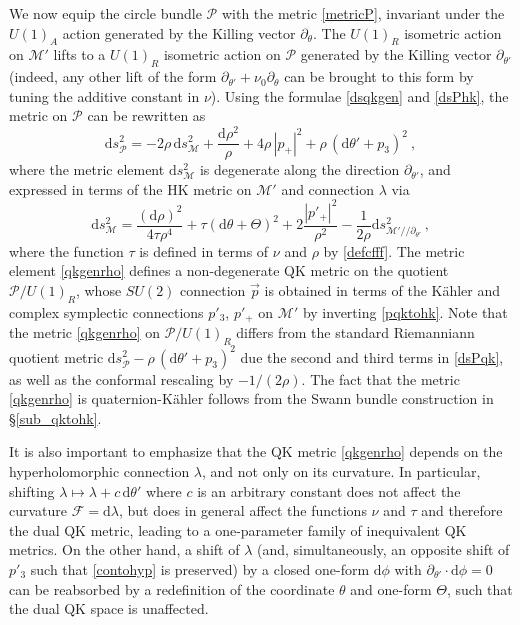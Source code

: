 \documentclass[12pt,reqno]{article}
\numberwithin{equation}{section}
\newcommand{\be}{\begin{equation}}
\newcommand{\ee}{\end{equation}}
\def\({\left(}
\def\){\right)}
\newcommand{\de}{\mathrm{d}}
\newcommand{\cM}{\mathcal{M}}
\newcommand{\cP}{\mathcal{P}}
\newcommand{\fb}{\mathscr{F}}
\def\pa{\partial}
\newcommand{\kahler}{{K\"ahler}\xspace}
\newcommand{\qk}{{quaternion-K\"ahler}\xspace}
\def\sigp{{\theta}}
\def\phip{{\theta'}}
\def\kcon{p'_3}
\def\hcon{p'_+}
\def\pcM{\cM'}
\def\cff{\tau} %
\def\cfff{\nu} %
\def\conhyper{\lambda}
\numberwithin{equation}{section}
\begin{document}
We now equip the circle bundle $\cP$ with the metric \eqref{metricP}, invariant
under the $U(1)_A$ action generated by the Killing vector $\pa_\sigp$.
The $U(1)_R$ isometric action on $\pcM$ lifts to a $U(1)_R$ isometric
action on $\cP$ generated by the Killing vector $\pa_\phip$
(indeed, any other lift of the form $\pa_\phip+ \cfff_0 \pa_{\sigp}$ can be brought to this
form  by tuning the additive constant in $\cfff$). Using the
formulae \eqref{dsqkgen} and \eqref{dsPhk},
the metric on $\cP$ can be rewritten as
\be
\label{dsPqk}
\de s^2_{\cP} = -2\rho \, \de s^2_{\cM} + \frac{\de\rho^2}{\rho} + 4\rho \, |p_+|^2
+ \rho \, ( \de\phip + p_3)^2\ ,
\ee
where the metric element $\de s^2_{\cM}$ is degenerate along the direction $\pa_\phip$,
and expressed in terms of the HK metric on $\pcM$  and connection $\lambda$ via
\be
\label{qkgenrho}
\de s^2_{\cM} = \frac{(\de\rho)^2}{4\cff \rho^4}+ \cff \(\de\sigp+\Theta\)^2
+2\frac{|p'_+|^2}{\rho^2} -\frac{1}{2\rho}  \de s^2_{\pcM//\pa_\phip}\, ,
\ee
where the function $\cff$ is defined in terms of $\cfff$ and $\rho$ by \eqref{defcfff}.
The metric element \eqref{qkgenrho} defines a non-degenerate QK metric on the quotient
$\cP/U(1)_R$, whose  $SU(2)$ connection $\vec p$  is obtained in terms of the
\kahler and complex symplectic connections $\kcon$, $\hcon$ on $\pcM$
by inverting \eqref{pqktohk}. Note that the metric \eqref{qkgenrho} on $\cP/U(1)_R$
differs from the standard Riemanniann quotient metric $\de s^2_{\cP} -\rho \, ( \de\phip + p_3)^2$
due the second and third terms in \eqref{dsPqk}, as well as the conformal rescaling by
$-1/(2\rho)$. The fact that the metric \eqref{qkgenrho} is \qk follows from the
Swann bundle construction in \S\ref{sub_qktohk}.

It is also important to emphasize that the QK metric \eqref{qkgenrho} depends on the
hyperholomorphic connection $\conhyper$, and not only on its curvature. In particular,
shifting $ \conhyper\mapsto  \conhyper+c\,\de\theta'$ where $c$ is an arbitrary constant
does not affect the curvature $\fb=\de\conhyper$, but  does in general affect
the functions $\cfff$ and $\cff$ and therefore
the dual QK metric, leading to a one-parameter family of
inequivalent QK metrics.
On the other hand, a shift of $\conhyper$ (and, simultaneously, an opposite
shift of $\kcon$ such that
\eqref{contohyp} is preserved) by a closed one-form $\de\phi$ with $\partial_\phip\cdot  \de\phi=0$
can be reabsorbed by a redefinition of the coordinate $\sigp$
and one-form $\Theta$, such that the dual QK space is unaffected.
\end{document}
